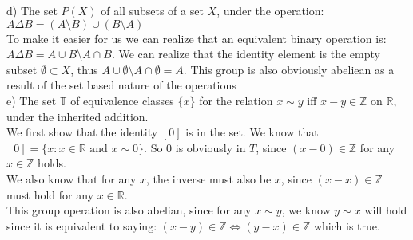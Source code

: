 \documentclass[20pt]{article}
\begin{document}
\begin{text}
    \noindent
    d) The set $P(X)$ of all subsets of a set $X$, under the operation: $A \Delta B = (A \setminus B) \cup (B \setminus A)$\\
    
    To make it easier for us we can realize that an equivalent binary operation is: $A \Delta B = A \cup B \setminus A \cap B$. We can realize that the identity element is the empty subset $\emptyset \subset X$, thus $A \cup \emptyset \setminus A \cap \emptyset = A$. This group is also obviously abeliean as a result of the set based nature of the operations\\
    
    \noindent
    e) The set $\mathbb{T}$ of equivalence classes $\{x\}$ for the relation $x \sim y$ iff $x - y \in \mathbb{Z}$ on $\mathbb{R}$, under the inherited addition.\\
    
    We first show that the identity $[0]$ is in the set. We know that $[0] = \{ x : x \in \mathbb{R} \text { and } x \sim 0\}$. So 0 is obviously in $T$, since $(x - 0) \in \mathbb{Z}$ for any $x \in \mathbb{Z}$ holds.\\
    
    We also know that for any $x$, the inverse must also be $x$, since $(x - x) \in \mathbb{Z}$ must hold for any $x \in \mathbb{R}$.\\
    
    This group operation is also abelian, since for any $x \sim y$, we know $y \sim x$ will hold since it is equivalent to saying:
    $(x - y) \in \mathbb{Z} \iff (y - x) \in \mathbb{Z}$ which is true.
\end{text}\\
\end{document}
